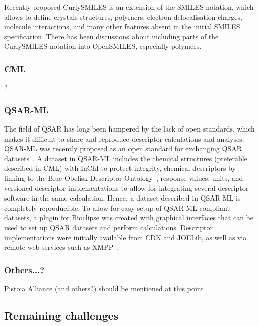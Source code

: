 \documentclass[10pt]{bmc_article}
\newenvironment{bmcformat}{\begin{raggedright}\baselineskip20pt\sloppy\setboolean{publ}{false}}{\end{raggedright}\baselineskip20pt\sloppy}
\begin{document}
\begin{bmcformat}
Recently proposed CurlySMILES\cite{CurlySMILES} is an extension of the
SMILES notation, which allows to define crystals structures, polymers,
electron delocalisation charges, molecule interactions, and many other
features absent in the initial SMILES specification. There has been
discussions about including parts of the CurlySMILES notation into
OpenSMILES, especially polymers.

\subsubsection*{CML}
?


\subsubsection*{QSAR-ML}
The field of QSAR has long been hampered by the lack of open standards, which makes it difficult to share and reproduce descriptor calculations and analyses. QSAR-ML was recently proposed as an open standard for exchanging QSAR datasets~\cite{Spjuth:2010uq}. A dataset in QSAR-ML includes the chemical structures (preferable described in CML) with InChI to protect integrity, chemical descriptors by linking to the Blue Obelisk Descriptor Ontology~\cite{bodo}, response values, units, and versioned descriptor implementations to allow for integrating several descriptor software in the same calculation. Hence, a dataset described in QSAR-ML is completely reproducible. To allow for easy setup of QSAR-ML compliant datasets, a plugin for Bioclipse was created with graphical interfaces that can be used to set up QSAR datasets and perform calculations. Descriptor implementations were initially available from CDK and JOELib, as well as via remote web services such as XMPP~\cite{Wagener:2009uq}.


\subsubsection*{Others...?}

Pistoia Alliance (and others?) should be mentioned at this point

  \subsection*{Remaining challenges}


\end{bmcformat}
\end{document}
